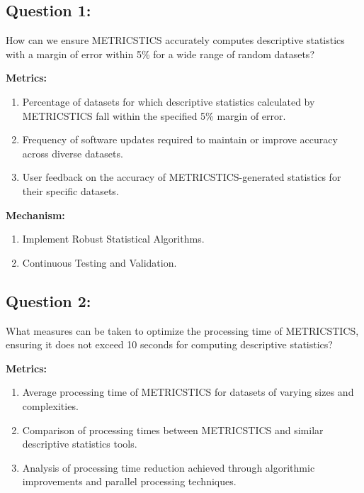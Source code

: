 \documentclass[12pt,letterpaper]{report}
\begin{document}
\subsection*{Question 1:} How can we ensure METRICSTICS accurately computes descriptive statistics with a margin of error within 5\% for a wide range of random datasets?

\item \textbf{Metrics:}

\begin{enumerate}
        \item Percentage of datasets for which descriptive statistics calculated by METRICSTICS fall within the specified 5\% margin of error.
        \item Frequency of software updates required to maintain or improve accuracy across diverse datasets.
        \item User feedback on the accuracy of METRICSTICS-generated statistics for their specific datasets.
\end{enumerate}

\item \textbf{Mechanism:}

\begin{enumerate}
    \item Implement Robust Statistical Algorithms.
    \item Continuous Testing and Validation.
\end{enumerate}

\subsection*{Question 2:} What measures can be taken to optimize the processing time of METRICSTICS, ensuring it does not exceed 10 seconds for computing descriptive statistics?

\item \textbf{Metrics:}

\begin{enumerate}
        \item Average processing time of METRICSTICS for datasets of varying sizes and complexities.
        \item Comparison of processing times between METRICSTICS and similar descriptive statistics tools.
        \item Analysis of processing time reduction achieved through algorithmic improvements and parallel processing techniques.
\end{enumerate}
\end{document}
